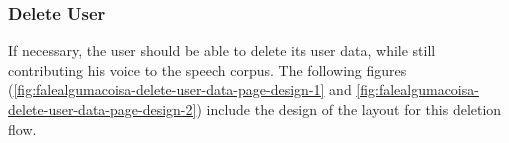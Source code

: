 \subsubsection{Delete User}

If necessary, the user should be able to delete its user data, while still contributing his voice to the speech corpus. The following figures (\ref{fig:falealgumacoisa-delete-user-data-page-design-1} and \ref{fig:falealgumacoisa-delete-user-data-page-design-2}) include the design of the layout for this deletion flow.

\begin{figure}[h]
    \centering
    \caption{Fale Alguma Coisa Delete User Data steps designs}
    \begin{subfigure}{.5\textwidth}
      \centering

\end{subfigure}
\end{figure}
